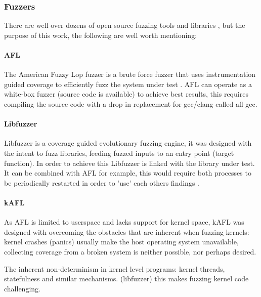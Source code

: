 \subsubsection{Fuzzers}

There are well over dozens of open source fuzzing tools and libraries \cite{awesome-fuzzing}, but the purpose of this work, the following
are well worth mentioning:


\paragraph{AFL}

The American Fuzzy Lop fuzzer is a brute force fuzzer that uses instrumentation guided coverage to
efficiently fuzz the system under test \cite{afl}. AFL can operate as a white-box fuzzer (source code is available)
to achieve best results, this requires compiling the source code with a drop in replacement for gcc/clang
called afl-gcc.


\paragraph{Libfuzzer}

Libfuzzer is a coverage guided evolutionary fuzzing engine, it was designed with the intent to fuzz
libraries, feeding fuzzed inputs to an entry point (target function). In order to achieve this Libfuzzer
is linked with the library under test. It can be combined with AFL for example, this would require both processes to be
periodically restarted in order to 'use' each others findings \cite{libfuzzer}.


\paragraph{kAFL}


As AFL is limited to userspace and lacks support for kernel space\cite{kafl}, kAFL was designed with overcoming
the obstacles that are inherent when fuzzing kernels: kernel crashes (panics) usually make the host operating system
unavailable, collecting coverage from a broken system is neither possible, nor perhaps desired.

The inherent non-determinism in kernel level programs: kernel threads, statefulness and similar mechanisms. (libfuzzer)
this makes fuzzing kernel code challenging.

